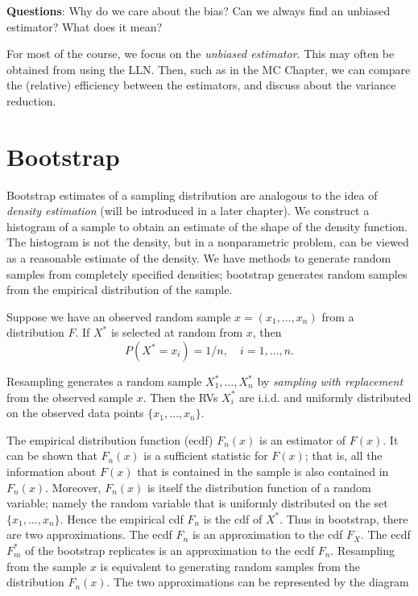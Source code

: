 \documentclass[
  letterpaper,
  DIV=11,
  numbers=noendperiod]{scrreprt}
\begin{document}
\textbf{Questions}: Why do we care about the bias? Can we always find an
unbiased estimator? What does it mean?

For most of the course, we focus on the \emph{unbiased estimator}. This
may often be obtained from using the LLN. Then, such as in the MC
Chapter, we can compare the (relative) efficiency between the
estimators, and discuss about the variance reduction.

\section{Bootstrap}\label{bootstrap}

Bootstrap estimates of a sampling distribution are analogous to the idea
of \emph{density estimation} (will be introduced in a later chapter). We
construct a histogram of a sample to obtain an estimate of the shape of
the density function. The histogram is not the density, but in a
nonparametric problem, can be viewed as a reasonable estimate of the
density. We have methods to generate random samples from completely
specified densities; bootstrap generates random samples from the
empirical distribution of the sample.

Suppose we have an observed random sample \(x=(x_1,\dots,x_n)\) from a
distribution \(F\). If \(X^\ast\) is selected at random from \(x\), then
\[P(X^\ast=x_i)=1/n,\quad i=1,\dots,n.\]

Resampling generates a random sample \(X^\ast_1,\dots,X_n^\ast\) by
\emph{sampling with replacement} from the observed sample \(x\). Then
the RVs \(X_i^\ast\) are i.i.d. and uniformly distributed on the
observed data points \(\{x_1,\dots,x_n\}\).

The empirical distribution function (ecdf) \(F_n(x)\) is an estimator of
\(F(x)\). It can be shown that \(F_n(x)\) is a sufficient statistic for
\(F(x)\); that is, all the information about \(F(x)\) that is contained
in the sample is also contained in \(F_n(x)\). Moreover, \(F_n(x)\) is
itself the distribution function of a random variable; namely the random
variable that is uniformly distributed on the set
\(\{x_1, \dots , x_n\}\). Hence the empirical cdf \(F_n\) is the cdf of
\(X^\ast\). Thus in bootstrap, there are two approximations. The ecdf
\(F_n\) is an approximation to the cdf \(F_X\). The ecdf \(F_m^\ast\) of
the bootstrap replicates is an approximation to the ecdf \(F_n\).
Resampling from the sample \(x\) is equivalent to generating random
samples from the distribution \(F_n(x)\). The two approximations can be
represented by the diagram
\end{document}
